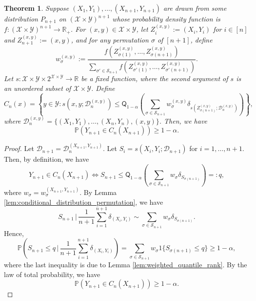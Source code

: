 \documentclass[11pt,letterpaper]{article}
\newtheorem{theorem}{Theorem} %
\theoremstyle{definition}
\newcommand{\cD}{\mathcal{D}}
\newcommand{\cS}{\mathcal{S}}
\newcommand{\cX}{\mathcal{X}}
\newcommand{\cY}{\mathcal{Y}}
\newcommand{\R}{\mathbb{R}}
\renewcommand{\P}{\mathbb{P}}
\begin{document}
\begin{theorem}
    \label{thm:weighted_conformal_permutation}
    Suppose $(X_1, Y_1), \ldots, (X_{n + 1}, Y_{n + 1})$ are drawn from some distribution $P_{n + 1}$ on $(\cX \times \cY)^{n + 1}$ whose probability density function is $f \colon (\cX \times \cY)^{n + 1} \to \R_+$. For $(x, y) \in \cX \times \cY$, let $Z_i^{(x, y)} := (X_i, Y_i)$ for $i \in [n]$ and $Z_{n + 1}^{(x, y)} := (x, y)$, and for any permutation $\sigma$ of $[n + 1]$, define
    \begin{equation*}
        w_\sigma^{(x, y)} := \frac{f(Z_{\sigma(1)}^{(x, y)}, \ldots, Z_{\sigma(n + 1)}^{(x, y)})}{\sum_{\sigma' \in \cS_{n + 1}} f(Z_{\sigma'(1)}^{(x, y)}, \ldots, Z_{\sigma'(n + 1)}^{(x, y)})}.
    \end{equation*} 
    Let $s \colon \cX \times \cY \times 2^{\cX \times \cY} \to \R$ be a fixed function, where the second argument of $s$ is an unordered subset of $\cX \times \cY$. Define
    \begin{equation*}
        C_n(x) = \left\{y \in \cY : s(x, y; \cD_n^{(x, y)}) \le \mathsf{Q}_{1 - \alpha}\left(\sum_{\sigma \in \cS_{n + 1}} w_\sigma^{(x, y)} \delta_{s(Z_{\sigma(n + 1)}^{(x, y)}; \cD_n^{(x, y)})}\right)\right\},
    \end{equation*}
    where $\cD_n^{(x, y)} = \{(X_1, Y_1), \ldots, (X_n, Y_n), (x, y)\}$. Then, we have
    \begin{equation*}
        \P(Y_{n + 1} \in C_n(X_{n + 1})) \ge 1 - \alpha.
    \end{equation*}
\end{theorem}
\begin{proof}
    Let $\cD_{n + 1} = \cD_n^{(X_{n + 1}, Y_{n + 1})}$. Let $S_i = s(X_i, Y_i; \cD_{n + 1})$ for $i = 1, \ldots, n + 1$. Then, by definition, we have
    \begin{equation*}
        Y_{n + 1} \in C_n(X_{n + 1}) \Leftrightarrow S_{n + 1} \le \mathsf{Q}_{1 - \alpha}\left(\sum_{\sigma \in \cS_{n + 1}} w_{\sigma} \delta_{S_{\sigma(n + 1)}}\right) =: q,
    \end{equation*}
    where $w_\sigma = w_\sigma^{(X_{n + 1}, Y_{n + 1})}$. By Lemma \ref{lem:conditional_distribution_permutation}, we have
    \begin{equation*}
        S_{n + 1} \, \Big| \, \frac{1}{n + 1} \sum_{i = 1}^{n + 1} \delta_{(X_i, Y_i)} \sim \sum_{\sigma \in \cS_{n + 1}} w_\sigma \delta_{S_{\sigma(n + 1)}}.
    \end{equation*}
    Hence, 
    \begin{equation*}
        \P\left(S_{n + 1} \le q \, | \, \frac{1}{n + 1} \sum_{i = 1}^{n + 1} \delta_{(X_i, Y_i)}\right) = \sum_{\sigma \in \cS_{n + 1}} w_\sigma 1\{S_{\sigma(n + 1)} \le q\} \ge 1 - \alpha,
    \end{equation*}
    where the last inequality is due to Lemma \ref{lem:weighted_quantile_rank}. By the law of total probability, we have
    \begin{equation*}
        \P(Y_{n + 1} \in C_n(X_{n + 1})) \ge 1 - \alpha.
    \end{equation*}
\end{proof}
\end{document}

